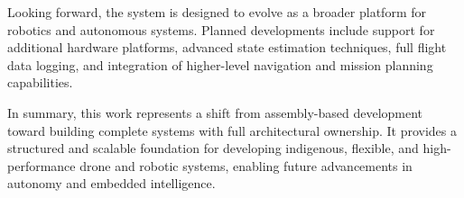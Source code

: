 Looking forward, the system is designed to evolve as a broader platform for robotics and autonomous systems. Planned developments include support for additional hardware platforms, advanced state estimation techniques, full flight data logging, and integration of higher-level navigation and mission planning capabilities.

In summary, this work represents a shift from assembly-based development toward building complete systems with full architectural ownership. It provides a structured and scalable foundation for developing indigenous, flexible, and high-performance drone and robotic systems, enabling future advancements in autonomy and embedded intelligence.
